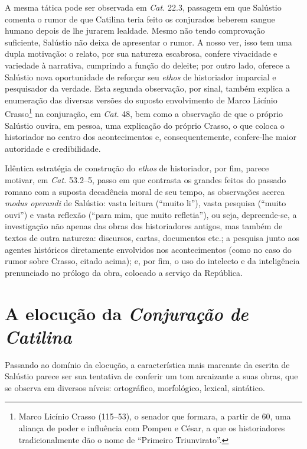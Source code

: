  
 A
 mesma tática pode ser observada em \emph{Cat.} 22.3, passagem em que Salústio comenta o
 rumor de que Catilina teria feito os conjurados beberem sangue humano depois de
 lhe jurarem lealdade. Mesmo não tendo
   comprovação suficiente, Salústio não deixa de apresentar o rumor. A nosso
   ver, isso tem uma dupla motivação: o relato, por sua natureza escabrosa,
   confere vivacidade e variedade à narrativa, cumprindo a função do deleite;
   por outro lado, oferece a Salústio nova oportunidade de reforçar seu
   \emph{ethos} de historiador imparcial e pesquisador da verdade. Esta segunda
   observação, por sinal, também explica a enumeração das diversas versões do
   suposto envolvimento de Marco Licínio Crasso\footnote{Marco Licínio Crasso
   (115--53), o senador que formara, a partir de 60, uma aliança de
 poder e influência com Pompeu e César, a que os historiadores tradicionalmente
 dão o nome de “Primeiro  Triunvirato”.} na conjuração, em \emph{Cat.} 48, bem
 como a observação de que o próprio Salústio ouvira, em pessoa, uma explicação
  do próprio Crasso, o que coloca o historiador no centro dos acontecimentos e,
 consequentemente, confere-lhe maior autoridade e credibilidade.
 

   
   
   Idêntica
   estratégia de construção do \emph{ethos} de historiador, por fim, parece
   motivar, em \emph{Cat.} 53.2--5, passo em que contrasta os grandes feitos do passado romano com a suposta decadência moral de seu tempo, as observações acerca \emph{modus operandi} de Salústio: vasta leitura (``muito li''), vasta pesquisa (``muito ouvi'') e vasta reflexão (``para mim, que muito refletia''), ou seja, depreende-se, a investigação não apenas das obras dos historiadores antigos, mas também de textos de outra natureza: discursos, cartas, documentos etc.; a pesquisa junto aos agentes históricos diretamente envolvidos nos acontecimentos (como no caso do rumor sobre Crasso, citado acima); e, por fim, o uso do intelecto e da inteligência prenunciado no prólogo da obra, colocado a serviço da República. 
   
   
 



\section{A elocução da \emph{Conjuração de Catilina}}

 Passando ao domínio da elocução, a característica mais marcante da escrita de
 Salústio parece ser sua tentativa de conferir um tom arcaizante a suas
 obras, que se observa em diversos níveis: ortográfico, morfológico, lexical,
 sintático. 
 
